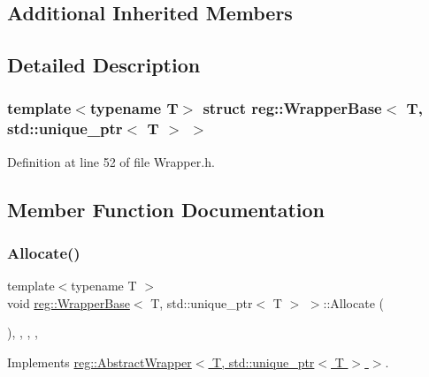 \subsection*{Additional Inherited Members}


\subsection{Detailed Description}
\subsubsection*{template$<$typename T$>$\newline
struct reg\+::\+Wrapper\+Base$<$ T, std\+::unique\+\_\+ptr$<$ T $>$ $>$}



Definition at line 52 of file Wrapper.\+h.



\subsection{Member Function Documentation}
\mbox{\label{structreg_1_1_wrapper_base_3_01_t_00_01std_1_1unique__ptr_3_01_t_01_4_01_4_a1b7e67476da7973f319d68e65543d1be}} 
\subsubsection{\texorpdfstring{Allocate()}{Allocate()}}
{\footnotesize\ttfamily template$<$typename T $>$ \\
void \hyperlink{structreg_1_1_wrapper_base}{reg\+::\+Wrapper\+Base}$<$ T, std\+::unique\+\_\+ptr$<$ T $>$ $>$\+::Allocate (\begin{DoxyParamCaption}{ }\end{DoxyParamCaption})\hspace{0.3cm}{\ttfamily [inline]}, {\ttfamily [override]}, {\ttfamily [protected]}, {\ttfamily [virtual]}, {\ttfamily [noexcept]}}



Implements \hyperlink{structreg_1_1_abstract_wrapper_aad461ca147a0a7fcfd4f8662994742f3}{reg\+::\+Abstract\+Wrapper$<$ T, std\+::unique\+\_\+ptr$<$ T $>$ $>$}.




